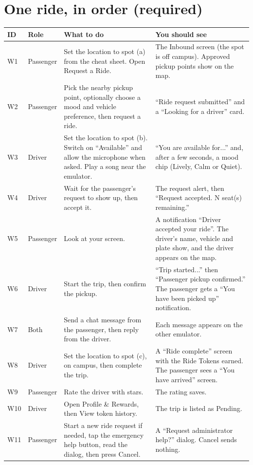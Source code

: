 \section*{One ride, in order (required)}
\small
\begin{longtable}{|p{1.0cm}|p{1.7cm}|p{6.2cm}|p{5.0cm}|}
\hline
\textbf{ID} & \textbf{Role} & \textbf{What to do} & \textbf{You should see} \\
\hline
\endhead
W1 & Passenger & Set the location to spot (a) from the cheat sheet. Open Request a Ride. & The Inbound screen (the spot is off campus). Approved pickup points show on the map. \\
\hline
W2 & Passenger & Pick the nearby pickup point, optionally choose a mood and vehicle preference, then request a ride. & ``Ride request submitted'' and a ``Looking for a driver'' card. \\
\hline
W3 & Driver & Set the location to spot (b). Switch on ``Available'' and allow the microphone when asked. Play a song near the emulator. & ``You are available for...'' and, after a few seconds, a mood chip (Lively, Calm or Quiet). \\
\hline
W4 & Driver & Wait for the passenger's request to show up, then accept it. & The request alert, then ``Request accepted. N seat(s) remaining.'' \\
\hline
W5 & Passenger & Look at your screen. & A notification ``Driver accepted your ride''. The driver's name, vehicle and plate show, and the driver appears on the map. \\
\hline
W6 & Driver & Start the trip, then confirm the pickup. & ``Trip started...'' then ``Passenger pickup confirmed.'' The passenger gets a ``You have been picked up'' notification. \\
\hline
W7 & Both & Send a chat message from the passenger, then reply from the driver. & Each message appears on the other emulator. \\
\hline
W8 & Driver & Set the location to spot (c), on campus, then complete the trip. & A ``Ride complete'' screen with the Ride Tokens earned. The passenger sees a ``You have arrived'' screen. \\
\hline
W9 & Passenger & Rate the driver with stars. & The rating saves. \\
\hline
W10 & Driver & Open Profile \& Rewards, then View token history. & The trip is listed as Pending. \\
\hline
W11 & Passenger & Start a new ride request if needed, tap the emergency help button, read the dialog, then press Cancel. & A ``Request administrator help?'' dialog. Cancel sends nothing. \\
\hline
\end{longtable}
\normalsize

